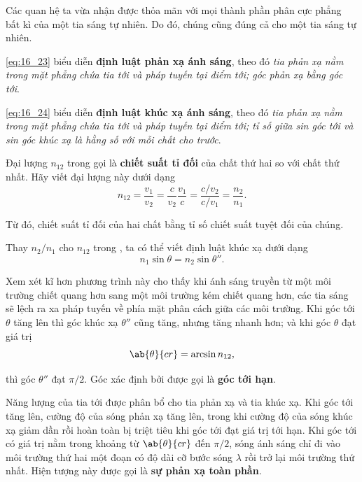 Các quan hệ ta vừa nhận được thỏa mãn với mọi thành phần phân cực phẳng bất kì của một tia sáng tự nhiên.
Do đó, chúng cũng đúng cả cho một tia sáng tự nhiên.

\eqref{eq:16_23} biểu diễn \textbf{định luật phản xạ ánh sáng}, theo đó \textit{tia phản xạ nằm trong mặt phẳng chứa tia tới và pháp tuyến tại điểm tới; góc phản xạ bằng góc tới}.

\eqref{eq:16_24} biểu diễn \textbf{định luật khúc xạ ánh sáng}, theo đó \textit{tia phản xạ nằm trong mặt phẳng chứa tia tới và pháp tuyến tại điểm tới; tỉ số giữa sin góc tới và sin góc khúc xạ là hằng số với mỗi chất cho trước}.

Đại lượng $n_{12}$ trong  gọi là \textbf{chiết suất tỉ đối} của chất thứ hai so với chất thứ nhất.
Hãy viết đại lượng này dưới dạng
\begin{equation}\label{eq:16_25}
    n_{12} = \frac{v_1}{v_2} = \frac{c}{v_2} \frac{v_1}{c} = \frac{c/v_2}{c/v_1} = \frac{n_2}{n_1}.
\end{equation}

\noindent
Từ đó, chiết suất tỉ đối của hai chất bằng tỉ số chiết suất tuyệt đối của chúng.

Thay $n_2/n_1$ cho $n_{12}$ trong , ta có thể viết định luật khúc xạ dưới dạng
\begin{equation}\label{eq:16_26}
    n_1 \sin\theta = n_2 \sin\theta''.
\end{equation}

\noindent
Xem xét kĩ hơn phương trình này cho thấy khi ánh sáng truyền từ một môi trường chiết quang hơn sang một môi trường kém chiết quang hơn, các tia sáng sẽ lệch ra xa pháp tuyến về phía mặt phân cách giữa các môi trường.
Khi góc tới $\theta$ tăng lên thì góc khúc xạ $\theta''$ cũng tăng, nhưng tăng nhanh hơn; và khi góc $\theta$ đạt giá trị
\begin{equation}\label{eq:16_27}
    \ab{\theta}{cr} = \arcsin n_{12},
\end{equation}

\noindent
thì góc $\theta''$ đạt $\pi/2$.
Góc xác định bởi  được gọi là \textbf{góc tới hạn}.

Năng lượng của tia tới được phân bổ cho tia phản xạ và tia khúc xạ.
Khi góc tới tăng lên, cường độ của sóng phản xạ tăng lên, trong khi cường độ của sóng khúc xạ giảm dần rồi hoàn toàn bị triệt tiêu khi góc tới đạt giá trị tới hạn.
Khi góc tới có giá trị nằm trong khoảng từ $\ab{\theta}{cr}$ đến $\pi/2$, sóng ánh sáng chỉ đi vào môi trường thứ hai một đoạn có độ dài cỡ bước sóng $\lambda$ rồi trở lại môi trường thứ nhất.
Hiện tượng này được gọi là \textbf{sự phản xạ toàn phần}.


